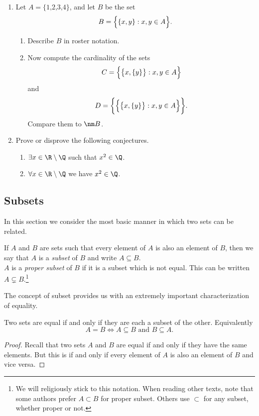 \begin{enumerate}
	\item Let $A=\{\text{1,2,3,4}\}$, and let $B$ be the set
	\[B=\Bigl\{\{x,y\}:x,y\in A\Bigr\}.\]
	\begin{enumerate}
	  \item Describe $B$ in roster notation.
		\item Now compute the cardinality of the sets
		\[C=\Bigl\{\bigl\{x,\{y\}\bigr\}:x,y\in A\Bigr\}\]
		and
		\[D=\biggl\{\Bigl\{\bigl\{x,\{y\}\bigr\}:x,y\in A\Bigr\}\biggr\}.\]
		Compare them to $\nm B$.
	\end{enumerate}
		
  \item Prove or disprove the following conjectures.
  \begin{enumerate}
    \item $\exists x\in\R\setminus\Q$ such that $x^2\in\Q$.
    \item $\forall x\in\R\setminus\Q$ we have $x^2\in\Q$.
	\end{enumerate}
\end{enumerate}
\newpage

\subsection{Subsets}

In this section we consider the most basic manner in which two sets can be related.

\begin{defn}\label{defn:subset}
If $A$ and $B$ are sets such that every element of $A$ is also an element of $B$, then we say that $A$ is a \emph{subset} of $B$ and write $A\subseteq B$.\\
$A$ is a \emph{proper subset} of $B$ if it is a subset which is not equal. This can be written $A\subsetneq B$.\footnote{We will religiously stick to this notation. When reading other texts, note that some authors prefer $A\subset B$ for proper subset. Others use $\subset$ for any subset, whether proper or not.}
\end{defn}

\noindent The concept of subset provides us with an extremely important characterization of equality.

\begin{thm}\label{thm:setequal}
Two sets are equal if and only if they are each a subset of the other. Equivalently
\[A=B\iff A\subseteq B\text{ and }B\subseteq A.\]
\end{thm}

\begin{proof}
Recall that two sets $A$ and $B$ are equal if and only if they have the same elements. But this is if and only if every element of $A$ is also an element of $B$ and vice versa.
\end{proof}

